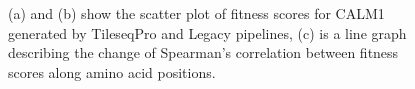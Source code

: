 \documentclass{article}
\begin{document}
\begin{figure}[H]%
    \centering
    \qquad
    \qquad
    \caption{(a) and (b) show the scatter plot of fitness scores for CALM1 generated by TileseqPro and Legacy pipelines, (c) is a line graph describing the change of Spearman's correlation between fitness scores along amino acid positions.}%
    \label{fig:scatter plot CALM1}%
\end{figure}
\end{document}
